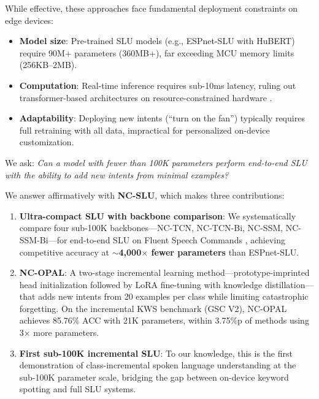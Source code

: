 \documentclass[11pt]{article}
\begin{document}
While effective, these approaches face fundamental deployment constraints on edge devices:
\begin{itemize}
\setlength\itemsep{1pt}
\item \textbf{Model size}: Pre-trained SLU models (e.g., ESPnet-SLU with HuBERT) require 90M+ parameters (360MB+), far exceeding MCU memory limits (256KB--2MB).
\item \textbf{Computation}: Real-time inference requires sub-10ms latency, ruling out transformer-based architectures on resource-constrained hardware \cite{banbury2021mlperf}.
\item \textbf{Adaptability}: Deploying new intents (``turn on the fan'') typically requires full retraining with all data, impractical for personalized on-device customization.
\end{itemize}

We ask: \emph{Can a model with fewer than 100K parameters perform end-to-end SLU with the ability to add new intents from minimal examples?}

We answer affirmatively with \textbf{NC-SLU}, which makes three contributions:

\begin{enumerate}
\setlength\itemsep{1pt}
\item \textbf{Ultra-compact SLU with backbone comparison}: We systematically compare four sub-100K backbones---NC-TCN, NC-TCN-Bi, NC-SSM, NC-SSM-Bi---for end-to-end SLU on Fluent Speech Commands \cite{lugosch2019speech}, achieving competitive accuracy at $\sim$\textbf{4,000$\times$ fewer parameters} than ESPnet-SLU.

\item \textbf{NC-OPAL}: A two-stage incremental learning method---prototype-imprinted head initialization followed by LoRA fine-tuning with knowledge distillation---that adds new intents from 20 examples per class while limiting catastrophic forgetting.
On the incremental KWS benchmark (GSC V2), NC-OPAL achieves 85.76\% ACC with 21K parameters, within 3.75\%p of methods using 3$\times$ more parameters.

\item \textbf{First sub-100K incremental SLU}: To our knowledge, this is the first demonstration of class-incremental spoken language understanding at the sub-100K parameter scale, bridging the gap between on-device keyword spotting and full SLU systems.
\end{enumerate}

\end{document}
